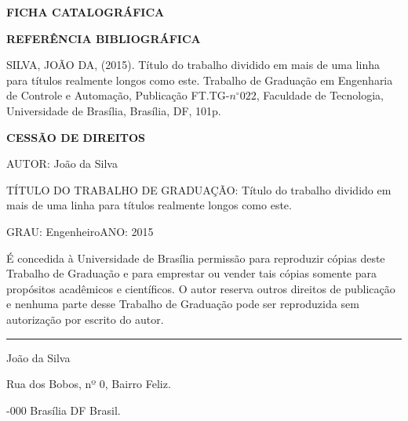 \noindent \textbf{FICHA CATALOGRÁFICA}

\noindent %

\noindent \medskip{}


\noindent \textbf{REFERÊNCIA BIBLIOGRÁFICA}

SILVA, JOÃO DA, (2015). Título do trabalho dividido em mais de uma
linha para títulos realmente longos como este. Trabalho de Graduação
em Engenharia de Controle e Automação, Publicação FT.TG-$n^{\circ}022$,
Faculdade de Tecnologia, Universidade de Brasília, Brasília, DF, 101p.

\noindent \bigskip{}


\noindent \textbf{CESSÃO DE DIREITOS}

\noindent AUTOR: João da Silva

TÍTULO DO TRABALHO DE GRADUAÇÃO: Título do trabalho dividido em mais
de uma linha para títulos realmente longos como este.

\noindent \medskip{}


\noindent GRAU: Engenheiro\hfill{}ANO: 2015\hfill{}

\noindent \medskip{}


É concedida à Universidade de Brasília permissão para reproduzir cópias
deste Trabalho de Graduação e para emprestar ou vender tais cópias
somente para propósitos acadêmicos e científicos. O autor reserva
outros direitos de publicação e nenhuma parte desse Trabalho de Graduação
pode ser reproduzida sem autorização por escrito do autor.

\noindent \bigskip{}


\noindent \rule[0.5ex]{1\columnwidth}{1pt}

\noindent João da Silva

\noindent Rua dos Bobos, nº 0, Bairro Feliz.

-000 Brasília \textendash{} DF \textendash{} Brasil.

